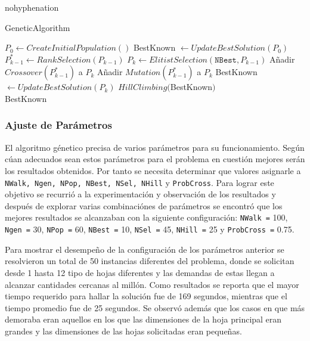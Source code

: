 \documentclass[a4paper,10pt,twocolumn]{article}
\begin{document}
\begin{hyphenrules}{nohyphenation}
\algrenewcommand{}
\algrenewcommand{}
\begin{algorithm}
	\caption{GeneticAlgorithm}\label{genetic}
	\begin{algorithmic}[1]
		\State $P_0 \gets CreateInitialPopulation()$
		\State BestKnown $\gets UpdateBestSolution(P_0)$
		\State$P_{k-1}^* \gets RankSelection(P_{k-1})$
		\State$P_{k} \gets ElitistSelection(\mathtt{NBest},P_{k-1})$
					\State Añadir $Crossover(P_{k-1}^*)$ a $P_k$
				\Else
					\State Añadir $Mutation(P_{k-1}^*)$ a $P_k$
				\EndIf	
			\EndFor
		\State BestKnown $\gets UpdateBestSolution(P_k)$
		\EndFor
		\State $ HillClimbing($BestKnown$)$\\
		\Return BestKnown
	\end{algorithmic}
\end{algorithm}


\subsubsection{Ajuste de Parámetros}
El algoritmo génetico precisa de varios parámetros para su funcionamiento. Según cúan adecuados sean estos parámetros para el problema en cuestión mejores serán los resultados obtenidos. Por tanto se necesita determinar que valores asignarle a \texttt{NWalk, Ngen, NPop, NBest, NSel, NHill} y \texttt{ProbCross}.
Para lograr este objetivo se recurrió a la experimentación y observación de los resultados y después de explorar varias combinaciónes de parámetros se encontró que los mejores resultados se alcanzaban con la siguiente configuración: \texttt{NWalk =} 100, \texttt{Ngen =} 30, \texttt{NPop =} 60, \texttt{NBest =} 10, \texttt{NSel =} 45, \texttt{NHill =} 25 y \texttt{ProbCross =} 0.75.

Para mostrar el desempe\~no de la configuración de los par\'ametros anterior se resolvieron un total de 50 instancias diferentes del problema, donde se solicitan desde 1 hasta 12 tipo de hojas diferentes y las demandas de estas llegan a alcanzar cantidades cercanas al mill\'on. Como resultados se reporta que el mayor tiempo requerido para hallar la soluci\'on fue de 169 segundos, mientras que el tiempo promedio fue de 25 segundos. Se observ\'o adem\'as que los casos en que m\'as demoraba eran aquellos en los que las dimensiones de la hoja principal eran grandes y las dimensiones de las hojas solicitadas eran peque\~nas.    


\end{hyphenrules}
\end{document}
